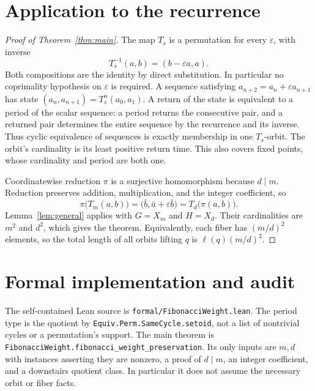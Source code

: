 \documentclass[11pt]{article}
\begin{document}
\section{Application to the recurrence}
\begin{proof}[Proof of Theorem~\ref{thm:main}]
The map $T_s$ is a permutation for every $\varepsilon$, with inverse
\[
 T_s^{-1}(a,b)=(b-\varepsilon a,a).
\]
Both compositions are the identity by direct substitution. In particular no
coprimality hypothesis on $\varepsilon$ is required. A sequence satisfying
$a_{n+2}=a_n+\varepsilon a_{n+1}$ has state $(a_n,a_{n+1})=T_s^n(a_0,a_1)$.
A return of the state is equivalent to a period of the scalar sequence: a
period returns the consecutive pair, and a returned pair determines the
entire sequence by the recurrence and its inverse. Thus cyclic equivalence
of sequences is exactly membership in one $T_s$-orbit. The orbit's cardinality
is its least positive return time. This also covers fixed points, whose
cardinality and period are both one.

Coordinatewise reduction $\pi$ is a surjective homomorphism because $d\mid m$.
Reduction preserves addition, multiplication, and the integer coefficient, so
\[
 \pi\bigl(T_m(a,b)\bigr)
   =\bigl(\bar b,\bar a+\varepsilon\bar b\bigr)
   =T_d\bigl(\pi(a,b)\bigr).
\]
Lemma~\ref{lem:general} applies with $G=X_m$ and $H=X_d$. Their cardinalities
are $m^2$ and $d^2$, which gives the theorem. Equivalently, each fiber has
$(m/d)^2$ elements, so the total length of all orbits lifting $q$ is
$\ell(q)(m/d)^2$.
\end{proof}

\section{Formal implementation and audit}
The self-contained Lean source is \nolinkurl{formal/FibonacciWeight.lean}.
The period type is the quotient by
\nolinkurl{Equiv.Perm.SameCycle.setoid}, not a list of nontrivial cycles or a
permutation's support. The main theorem is
\nolinkurl{FibonacciWeight.fibonacci_weight_preservation}.
Its only inputs are $m,d$ with instances asserting they are nonzero, a proof
of $d\mid m$, an integer coefficient, and a downstairs quotient class.
In particular it does not assume the necessary orbit or fiber facts.
\end{document}
